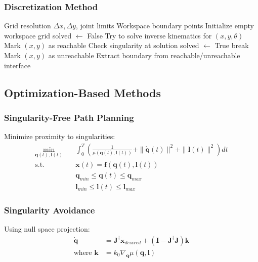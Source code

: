 \documentclass[11pt,a4paper]{article}
\begin{document}
\subsubsection{Discretization Method}
\begin{algorithm}
\caption{Workspace Boundary Detection}
\begin{algorithmic}[1]
\REQUIRE Grid resolution $\Delta x, \Delta y$, joint limits
\ENSURE Workspace boundary points
\STATE Initialize empty workspace grid
        \STATE solved $\leftarrow$ False
            \STATE Try to solve inverse kinematics for $(x, y, \theta)$
                \STATE Mark $(x, y)$ as reachable
                \STATE Check singularity at solution
                \STATE solved $\leftarrow$ True
                \STATE break
            \ENDIF
        \ENDFOR
            \STATE Mark $(x, y)$ as unreachable
        \ENDIF
    \ENDFOR
\ENDFOR
\STATE Extract boundary from reachable/unreachable interface
\end{algorithmic}
\end{algorithm}

\subsection{Optimization-Based Methods}

\subsubsection{Singularity-Free Path Planning}
Minimize proximity to singularities:
\begin{align}
\min_{\bm{q}(t), \bm{l}(t)} &\quad \int_0^T \left( \frac{1}{\mu(\bm{q}(t), \bm{l}(t))} + \|\dot{\bm{q}}(t)\|^2 + \|\dot{\bm{l}}(t)\|^2 \right) dt \\
\text{s.t.} &\quad \bm{x}(t) = \bm{f}(\bm{q}(t), \bm{l}(t)) \\
&\quad \bm{q}_{min} \leq \bm{q}(t) \leq \bm{q}_{max} \\
&\quad \bm{l}_{min} \leq \bm{l}(t) \leq \bm{l}_{max}
\end{align}

\subsubsection{Singularity Avoidance}
Using null space projection:
\begin{align}
\dot{\bm{q}} &= \bm{J}^{\dagger} \dot{\bm{x}}_{desired} + (\bm{I} - \bm{J}^{\dagger}\bm{J}) \bm{k} \\
\text{where } \bm{k} &= k_0 \nabla_{\bm{q}} \mu(\bm{q}, \bm{l})
\end{align}
\end{document}
